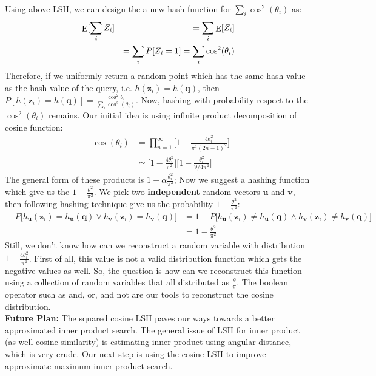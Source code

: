 \documentclass[11pt, a4paper, reqno, twoside]{scrartcl}
\theoremstyle{style}
\DeclareMathOperator*{\E}{\rm E}
\newcommand{\z}{\bm{z}}
\newcommand{\qv}{\bm{q}}
\newcommand{\uv}{\bm{u}}
\newcommand{\vv}{\bm{v}}
\newcommand{\0}{\mathbf{0}} %
\begin{document}
Using above LSH, we can design the a new hash function for $\sum_i
\cos^2(\theta_i)$ as:
\begin{eqnarray*}
	& \E [\sum_i Z_i] & = \sum_i \E [Z_i]\\
	& & = \sum_i P[Z_i = 1] = \sum_i\cos^2(\theta_i)
\end{eqnarray*} 
Therefore, if we uniformly return a random point which has the same hash value
as the hash value of the query, i.e. $h(\z_i) = h(\qv)$, then $P[h(\z_i) =
h(\qv)] = \frac{\cos^2 \theta_i}{\sum_i \cos^2(\theta_i)}$.
Now, hashing with probability respect to the $\cos^2(\theta_i)$ remains.
Our initial idea is using infinite product decomposition of cosine function:
\begin{eqnarray*}
	& \cos(\theta_i) & = \prod_{n=1}^{\infty} \bigg[1-\frac{4
	\theta_i^2}{\pi^2(2n-1)^2}\bigg] \\
	& & \simeq \bigg[1-\frac{4
	\theta_i^2}{\pi^2}\bigg] \bigg[ 1-\frac{\theta_i^2}{9/4 \pi^2} \bigg]
\end{eqnarray*}
The general form of these products is $1-\alpha \frac{\theta^2_i}{\pi^2} $; Now
we suggest a hashing function which give us the $1-\frac{\theta^2}{\pi^2}$.
We pick two \textbf{independent} random vectors $\uv$ and $\vv$, then following
hashing technique give us the probability $1-\frac{\theta^2}{\pi^2}$: 
\begin{eqnarray*}
	& P\bigg[  h_{\uv}(\z_i) = h_{\uv}(\qv) \vee h_{\vv}(\z_i) = h_{\vv}(\qv)
	\bigg] & = 1 - P\bigg[  h_{\uv}(\z_i) \neq h_{\uv}(\qv) \wedge h_{\vv}(\z_i)
	\neq h_{\vv}(\qv) \bigg] \\
	& & = 1-\frac{\theta^2}{\pi^2}
\end{eqnarray*}
Still, we don't know how can we reconstruct a random variable with distribution 
$1-\frac{4
	\theta_i^2}{\pi^2}$. First of all, this value is not a valid distribution
	function which gets the negative values as well. So, the question is how
	can we reconstruct this function using a collection of random variables that
	all distributed as $\frac{\theta}{\pi}$. The boolean operator such as and, or, and
	not are our tools to reconstruct the cosine distribution. \\
\textbf{Future Plan:}
The squared cosine LSH paves our ways towards a better approximated inner
product search. The general issue of LSH for inner product (as well cosine
similarity) is estimating inner product using angular distance, which is very
crude. Our next step is using the cosine LSH to improve approximate maximum
inner product search.\\ 
\end{document}
